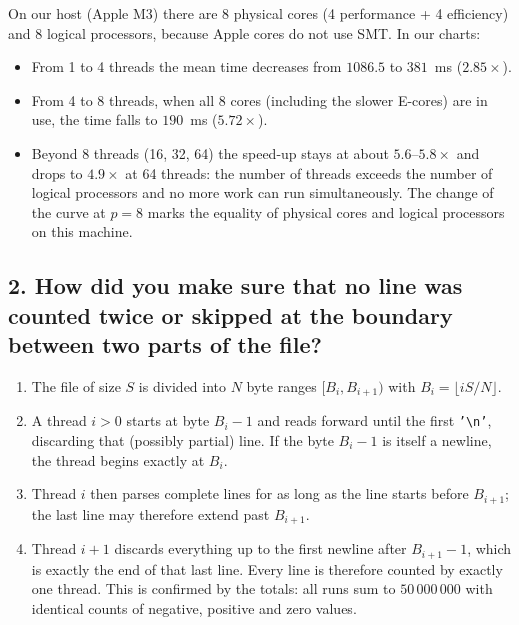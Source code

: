 \documentclass[11pt,a4paper]{article}
\begin{document}
On our host (Apple M3) there are 8 physical cores (4 performance + 4 efficiency) and 8 logical processors, because Apple cores do not use SMT. In our charts:
\begin{itemize}
    \item From 1 to 4 threads the mean time decreases from $1086.5$ to $381$~ms ($2.85\times$).
    \item From 4 to 8 threads, when all 8 cores (including the slower E-cores) are in use, the time falls to $190$~ms ($5.72\times$).
    \item Beyond 8 threads (16, 32, 64) the speed-up stays at about $5.6$--$5.8\times$ and drops to $4.9\times$ at 64 threads: the number of threads exceeds the number of logical processors and no more work can run simultaneously. The change of the curve at $p = 8$ marks the equality of physical cores and logical processors on this machine.
\end{itemize}

\subsection{2. How did you make sure that no line was counted twice or skipped at the boundary between two parts of the file?}
\begin{enumerate}
    \item The file of size $S$ is divided into $N$ byte ranges $[B_i, B_{i+1})$ with $B_i = \lfloor iS/N \rfloor$.
    \item A thread $i > 0$ starts at byte $B_i - 1$ and reads forward until the first \texttt{'\textbackslash n'}, discarding that (possibly partial) line. If the byte $B_i - 1$ is itself a newline, the thread begins exactly at $B_i$.
    \item Thread $i$ then parses complete lines for as long as the line starts before $B_{i+1}$; the last line may therefore extend past $B_{i+1}$.
    \item Thread $i+1$ discards everything up to the first newline after $B_{i+1} - 1$, which is exactly the end of that last line. Every line is therefore counted by exactly one thread. This is confirmed by the totals: all runs sum to $50\,000\,000$ with identical counts of negative, positive and zero values.
\end{enumerate}
\end{document}
